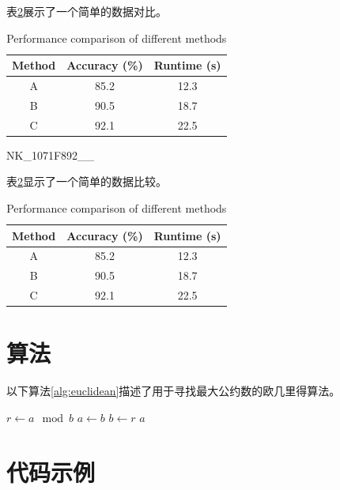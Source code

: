 \documentclass[12pt,a4paper]{ctexart}
\begin{document}
表\ref{tab:example}展示了一个简单的数据对比。
\begin{table}[h!]
    \centering
\begin{tabular}{|c|c|c|}
        \hline
        Method & Accuracy (\%) & Runtime (s) \\
        \hline
        A & 85.2 & 12.3 \\
        B & 90.5 & 18.7 \\
        C & 92.1 & 22.5 \\
        \hline
\end{tabular}
    \caption{Performance comparison of different methods}
    \label{tab:example}
\end{table}NK\_1071F892\_\_

表\ref{tab:example}显示了一个简单的数据比较。
\begin{table}[h!]
    \centering
\begin{tabular}{|c|c|c|}
        \hline
        Method & Accuracy (\%) & Runtime (s) \\
        \hline
        A & 85.2 & 12.3 \\
        B & 90.5 & 18.7 \\
        C & 92.1 & 22.5 \\
        \hline
\end{tabular}
    \caption{Performance comparison of different methods}
    \label{tab:example}
\end{table}

\section{算法}
\label{sec:algorithms}

以下算法\ref{alg:euclidean}描述了用于寻找最大公约数的欧几里得算法。
\begin{algorithm}
    \caption{欧几里得算法}
    \label{alg:euclidean}
\begin{algorithmic}[1]
                \State $r \gets a \mod b$
                \State $a \gets b$
                \State $b \gets r$
            \EndWhile
            \Return $a$
        \EndFunction
\end{algorithmic}
\end{algorithm}

\section{代码示例}
\label{sec:code}
\end{document}
